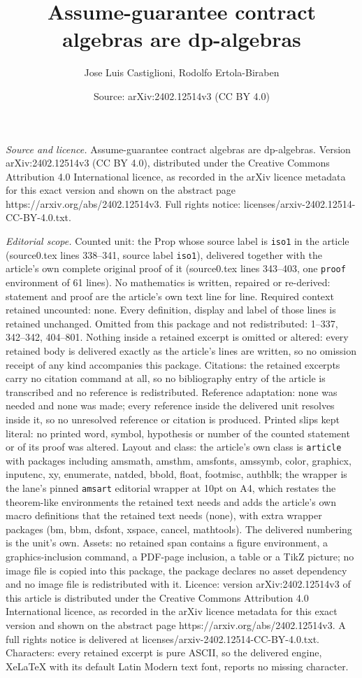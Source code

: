 \documentclass[10pt,a4paper]{amsart}
\title[Assume-guarantee contract algebras are dp-algebras]{Assume-guarantee contract algebras are dp-algebras}
\author{Jose Luis Castiglioni, Rodolfo Ertola-Biraben}
\date{Source: arXiv:2402.12514v3 (CC BY 4.0)}
\begin{document}
\maketitle

\noindent\emph{Source and licence.} Assume-guarantee contract algebras are dp-algebras. Version arXiv:2402.12514v3 (CC BY 4.0), distributed under the Creative Commons Attribution 4.0 International licence, as recorded in the arXiv licence metadata for this exact version and shown on the abstract page https://arxiv.org/abs/2402.12514v3. Full rights notice: licenses/arxiv-2402.12514-CC-BY-4.0.txt.\par\smallskip

\noindent\textit{Editorial scope.} Counted unit: the Prop whose source label is \texttt{iso1} in the article (source0.tex lines 338--341, source label \texttt{iso1}), delivered together with the article's own complete original proof of it (source0.tex lines 343--403, one \texttt{proof} environment of 61 lines). No mathematics is written, repaired or re-derived: statement and proof are the article's own text line for line. Required context retained uncounted: none. Every definition, display and label of those lines is retained unchanged. Omitted from this package and not redistributed: 1--337, 342--342, 404--801. Nothing inside a retained excerpt is omitted or altered: every retained body is delivered exactly as the article's lines are written, so no omission receipt of any kind accompanies this package. Citations: the retained excerpts carry no citation command at all, so no bibliography entry of the article is transcribed and no reference is redistributed. Reference adaptation: none was needed and none was made; every reference inside the delivered unit resolves inside it, so no unresolved reference or citation is produced. Printed slips kept literal: no printed word, symbol, hypothesis or number of the counted statement or of its proof was altered. Layout and class: the article's own class is \texttt{article} with packages including amsmath, amsthm, amsfonts, amssymb, color, graphicx, inputenc, xy, enumerate, natded, bbold, float, footmisc, authblk; the wrapper is the lane's pinned \texttt{amsart} editorial wrapper at 10pt on A4, which restates the theorem-like environments the retained text needs and adds the article's own macro definitions that the retained text needs (none), with extra wrapper packages (bm, bbm, dsfont, xspace, cancel, mathtools). The delivered numbering is the unit's own. Assets: no retained span contains a figure environment, a graphics-inclusion command, a PDF-page inclusion, a table or a TikZ picture; no image file is copied into this package, the package declares no asset dependency and no image file is redistributed with it. Licence: version arXiv:2402.12514v3 of this article is distributed under the Creative Commons Attribution 4.0 International licence, as recorded in the arXiv licence metadata for this exact version and shown on the abstract page https://arxiv.org/abs/2402.12514v3. A full rights notice is delivered at licenses/arxiv-2402.12514-CC-BY-4.0.txt. Characters: every retained excerpt is pure ASCII, so the delivered engine, XeLaTeX with its default Latin Modern text font, reports no missing character.
\end{document}

